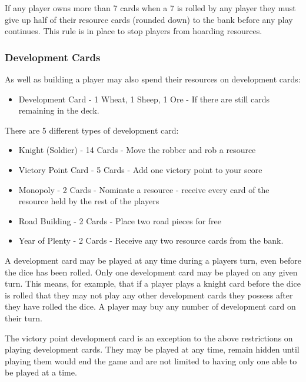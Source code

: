 \documentclass[]{article}
\begin{document}
\par If any player owns more than 7 cards when a 7 is rolled by any player they must give up half of their resource cards (rounded down) to the bank before any play continues. This rule is in place to stop players from hoarding resources. 

\subsubsection{Development Cards}
As well as building a player may also spend their resources on development cards:
\begin{itemize}
	\item Development Card - 1 Wheat, 1 Sheep, 1 Ore - If there are still cards remaining in the deck.
\end{itemize}

\par There are 5 different types of development card:

\begin{itemize}
	\item Knight (Soldier) - 14 Cards - Move the robber and rob a resource
	\item Victory Point Card - 5 Cards - Add one victory point to your score
	\item Monopoly - 2 Cards - Nominate a resource - receive every card of the resource held by the rest of the players
	\item Road Building - 2 Cards - Place two road pieces for free
	\item Year of Plenty - 2 Cards - Receive any two resource cards from the bank.
\end{itemize}

\par A development card may be played at any time during a players turn, even before the dice has been rolled. Only one development card may be played on any given turn. This means, for example, that if a player plays a knight card before the dice is rolled that they may not play any other development cards they possess after they have rolled the dice. A player may buy any number of development card on their turn.

\par The victory point development card is an exception to the above restrictions on playing development cards. They may be played at any time, remain hidden until playing them would end the game and are not limited to having only one able to be played at a time.
\end{document}
